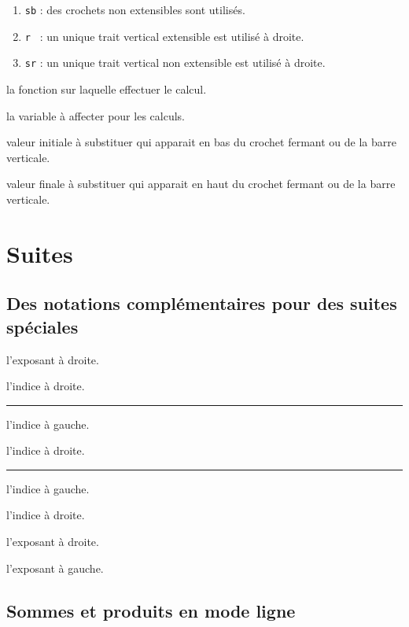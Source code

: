 \documentclass[12pt,a4paper]{book}
\theoremstyle{definition}
\newcommand\separation{
	\medskip
	\hfill\rule{0.5\textwidth}{0.75pt}\hfill
	\medskip
}
\begin{document}
{{\begin{enumerate}
	\item \verb+sb+ : des crochets non extensibles sont utilisés.

	\item \verb+r + : un unique trait vertical extensible est utilisé à droite.

	\item \verb+sr+ : un unique trait vertical non extensible est utilisé à droite.
\end{enumerate}

 la fonction sur laquelle effectuer le calcul.

 la variable à affecter pour les calculs.

 valeur initiale à substituer qui apparait en bas du crochet fermant ou de la barre verticale.

 valeur finale à substituer qui apparait en haut du crochet fermant ou de la barre verticale.


\section{Suites}

\subsection{Des notations complémentaires pour des suites spéciales}




 l'exposant à droite.

 l'indice à droite.


\separation



 l'indice à gauche.

 l'indice à droite.


\separation



 l'indice à gauche.

 l'indice à droite.

 l'exposant à droite.

 l'exposant à gauche.


\subsection{Sommes et produits en mode ligne}



}}
\end{document}
